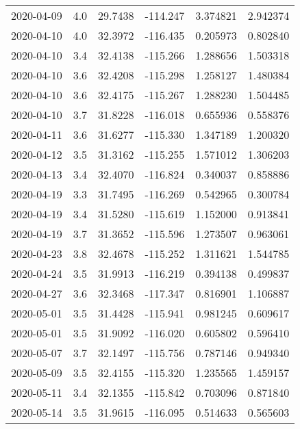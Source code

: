 \begin{tabular}{lrrrrr}
2020-04-09 &       4.0 &  29.7438 &  -114.247 &         3.374821 &         2.942374 \\
2020-04-10 &       4.0 &  32.3972 &  -116.435 &         0.205973 &         0.802840 \\
2020-04-10 &       3.4 &  32.4138 &  -115.266 &         1.288656 &         1.503318 \\
2020-04-10 &       3.6 &  32.4208 &  -115.298 &         1.258127 &         1.480384 \\
2020-04-10 &       3.6 &  32.4175 &  -115.267 &         1.288230 &         1.504485 \\
2020-04-10 &       3.7 &  31.8228 &  -116.018 &         0.655936 &         0.558376 \\
2020-04-11 &       3.6 &  31.6277 &  -115.330 &         1.347189 &         1.200320 \\
2020-04-12 &       3.5 &  31.3162 &  -115.255 &         1.571012 &         1.306203 \\
2020-04-13 &       3.4 &  32.4070 &  -116.824 &         0.340037 &         0.858886 \\
2020-04-19 &       3.3 &  31.7495 &  -116.269 &         0.542965 &         0.300784 \\
2020-04-19 &       3.4 &  31.5280 &  -115.619 &         1.152000 &         0.913841 \\
2020-04-19 &       3.7 &  31.3652 &  -115.596 &         1.273507 &         0.963061 \\
2020-04-23 &       3.8 &  32.4678 &  -115.252 &         1.311621 &         1.544785 \\
2020-04-24 &       3.5 &  31.9913 &  -116.219 &         0.394138 &         0.499837 \\
2020-04-27 &       3.6 &  32.3468 &  -117.347 &         0.816901 &         1.106887 \\
2020-05-01 &       3.5 &  31.4428 &  -115.941 &         0.981245 &         0.609617 \\
2020-05-01 &       3.5 &  31.9092 &  -116.020 &         0.605802 &         0.596410 \\
2020-05-07 &       3.7 &  32.1497 &  -115.756 &         0.787146 &         0.949340 \\
2020-05-09 &       3.5 &  32.4155 &  -115.320 &         1.235565 &         1.459157 \\
2020-05-11 &       3.4 &  32.1355 &  -115.842 &         0.703096 &         0.871840 \\
2020-05-14 &       3.5 &  31.9615 &  -116.095 &         0.514633 &         0.565603 \\

\end{tabular}
